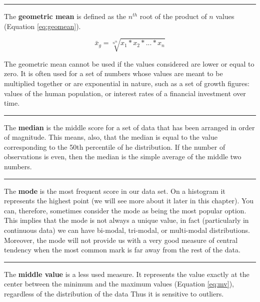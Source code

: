 \documentclass[
]{article}
\begin{document}
\begin{center}\rule{0.5\linewidth}{0.5pt}\end{center}

The \textbf{geometric mean} is defined as the \(n^{th}\) root of the product of
\(n\) values (Equation \eqref{eq:geomean}).

\begin{equation}
\bar x_{g} = \sqrt[n^{th}]{x_1*x_2*...*x_n}
\label{eq:geomean}
\end{equation}

The geometric mean cannot be used if the values considered are lower
or equal to zero. It is often used for a set of numbers whose values are
meant to be multiplied together or are exponential in nature, such as a
set of growth figures: values of the human population, or interest rates
of a financial investment over time.

\begin{center}\rule{0.5\linewidth}{0.5pt}\end{center}

The \textbf{median} is the middle score for a set of data that has been
arranged in order of magnitude. This means, also, that the median is
equal to the value corresponding to the 50th percentile of he
distribution. If the number of observations is even, then the median is
the simple average of the middle two numbers.

\begin{center}\rule{0.5\linewidth}{0.5pt}\end{center}

The \textbf{mode} is the most frequent score in our data set. On a histogram
it represents the highest point (we will see more about it later in this
chapter). You can, therefore, sometimes consider the mode as being the
most popular option. This implies that the mode is not always a unique
value, in fact (particularly in continuous data) we can have bi-modal,
tri-modal, or multi-modal distributions. Moreover, the mode will not
provide us with a very good measure of central tendency when the most
common mark is far away from the rest of the data.

\begin{center}\rule{0.5\linewidth}{0.5pt}\end{center}

The \textbf{middle value} is a less used measure. It represents the value
exactly at the center between the minimum and the maximum values
(Equation \eqref{eq:mv}), regardless of the distribution of the data Thus it is
sensitive to outliers.
\end{document}
